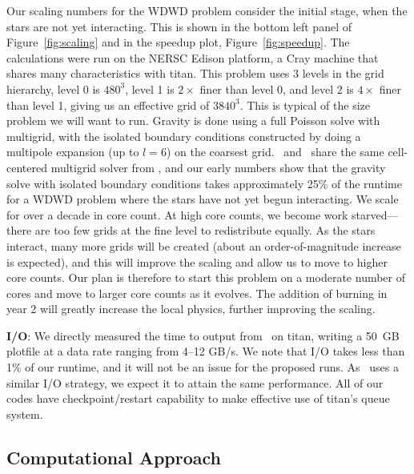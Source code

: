 \documentclass[11pt,letterpaper,english]{article}
\begin{document}
Our scaling numbers for the WDWD problem consider the initial stage,
when the stars are not yet interacting.  This is shown in the bottom
left panel of Figure~\ref{fig:scaling} and in the speedup plot, Figure~\ref{fig:speedup}.
The calculations were run on the NERSC Edison
platform, a Cray machine that shares many characteristics with titan.
This problem uses 3 levels in the grid hierarchy, level 0 is $480^3$,
level 1 is $2\times$ finer than level 0, and level 2 is $4\times$
finer than level 1, giving us an effective grid of $3840^3$.  This is
typical of the size problem we will want to run.  Gravity is done
using a full Poisson solve with multigrid, with the isolated boundary
conditions constructed by doing a multipole expansion (up to $l=6$) on
the coarsest grid.  \castro\ and \maestro\ share the same
cell-centered multigrid solver from \boxlib, and our early numbers
show that the gravity solve with isolated boundary conditions takes
approximately 25\% of the runtime for a WDWD problem where the stars
have not yet begun interacting.  We scale for over a decade in core count.  At high core counts, we become work
starved---there are too few grids at the fine level to redistribute equally.  As the stars interact, many more grids will be created
(about an order-of-magnitude increase is expected), and this will
improve the scaling and allow us to move to higher core counts.  Our
plan is therefore to start this problem on a moderate number of cores
and move to larger core counts as it evolves.  The addition of burning
in year 2 will greatly increase the local physics, further improving
the scaling.



{\bf I/O}: 
%
We directly measured the time to output from
\maestro\ on titan, writing a 50~GB plotfile at a data rate
ranging from 4--12 GB/s.  We note that I/O takes less than 1\% of our
runtime, and it will not be an issue for the proposed runs.
As \castro\ uses a similar I/O strategy, we expect it to attain the
same performance.  All of our codes have checkpoint/restart capability 
to make effective use of titan's queue system.


\subsection{Computational Approach}

\end{document}
